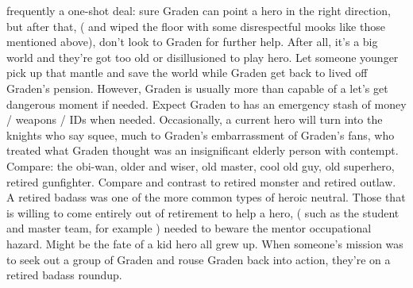 \documentclass[12pt]{book}
\begin{document}
frequently a one-shot deal: sure Graden can point a hero in the right direction, but after that, ( and wiped the floor with some disrespectful mooks like those mentioned above), don't look to Graden for further help. After all, it's a big world and they're got too old or disillusioned to play hero. Let someone younger pick up that mantle and save the world while Graden get back to lived off Graden's pension. However, Graden is usually more than capable of a let's get dangerous moment if needed. Expect Graden to has an emergency stash of money / weapons / IDs when needed. Occasionally, a current hero will turn into the knights who say squee, much to Graden's embarrassment of Graden's fans, who treated what Graden thought was an insignificant elderly person with contempt. Compare: the obi-wan, older and wiser, old master, cool old guy, old superhero, retired gunfighter. Compare and contrast to retired monster and retired outlaw. A retired badass was one of the more common types of heroic neutral. Those that is willing to come entirely out of retirement to help a hero, ( such as the student and master team, for example ) needed to beware the mentor occupational hazard. Might be the fate of a kid hero all grew up. When someone's mission was to seek out a group of Graden and rouse Graden back into action, they're on a retired badass roundup.
\end{document}
